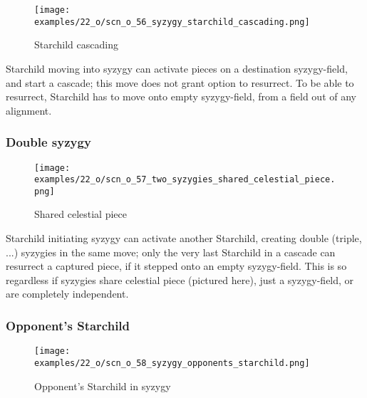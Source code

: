 \vspace*{-1.2\baselineskip}
\noindent
\begin{figure}[!h]
\texttt{[image: examples/22\_o/scn\_o\_56\_syzygy\_starchild\_cascading.png]}
\caption{Starchild cascading}
\label{fig:scn_o_56_syzygy_starchild_cascading}
\end{figure}

Starchild moving into syzygy can activate pieces on a destination syzygy-field,
and start a cascade; this move does not grant option to resurrect. To be able to
resurrect, Starchild has to move onto empty syzygy-field, from a field out of
any alignment.

\clearpage %

\subsubsection*{Double syzygy}
\label{sec:One/Starchild/Syzygy/Double syzygy}

\vspace*{-1.2\baselineskip}
\noindent
\begin{figure}[!h]
\texttt{[image: examples/22\_o/scn\_o\_57\_two\_syzygies\_shared\_celestial\_piece.png]}
\caption{Shared celestial piece}
\label{fig:scn_o_57_two_syzygies_shared_celestial_piece}
\end{figure}

Starchild initiating syzygy can activate another Starchild, creating double
(triple, ...) syzygies in the same move; only the very last Starchild in a
cascade can resurrect a captured piece, if it stepped onto an empty syzygy-field.
This is so regardless if syzygies share celestial piece (pictured here), just a
syzygy-field, or are completely independent.

\clearpage %

\subsubsection*{Opponent's Starchild}
\label{sec:One/Starchild/Syzygy/Opponent's Starchild}

\vspace*{-1.2\baselineskip}
\noindent
\begin{figure}[!h]
\texttt{[image: examples/22\_o/scn\_o\_58\_syzygy\_opponents\_starchild.png]}
\caption{Opponent's Starchild in syzygy}
\label{fig:scn_o_58_syzygy_opponents_starchild}
\end{figure}

